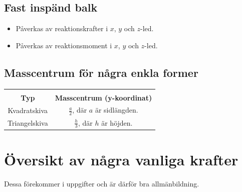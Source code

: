 \documentclass{article}
\newenvironment{ankiflashcard}[1]{}{}
\begin{document}
\begin{paracol}{2}
\begin{ankiflashcard}{Vilka reaktionskrafter påverkas en fast inspänd balk av?}
\subsection{Fast inspänd balk}
\begin{itemize}
    \item Påverkas av reaktionskrafter i $x$, $y$ och $z$-led.
    \item Påverkas av reaktionsmoment i $x$, $y$ och $z$-led.
\end{itemize}
\end{ankiflashcard}
\end{paracol}

\newpage
\begin{appendix}
\appendixpage
\begin{ankiflashcard}{Ange masscentrum för en kvadrat och triangel.}
    
\section{Masscentrum för några enkla former}
\large{
\begin{tabular}{|c|c|}
    \hline \\
     \textbf{Typ} &  \textbf{Masscentrum (y-koordinat)} \\
     \hline
     Kvadratskiva & $\frac a 2$, där $a$ är sidlängden. \\
     \hline
    Triangelskiva & $\frac h 3$, där $h$ är höjden. \\
    \hline
    
\end{tabular}
}
\end{ankiflashcard}
\end{appendix}
\section{Översikt av några vanliga krafter}
Dessa förekommer i uppgifter och är därför bra allmänbildning.
\end{document}
